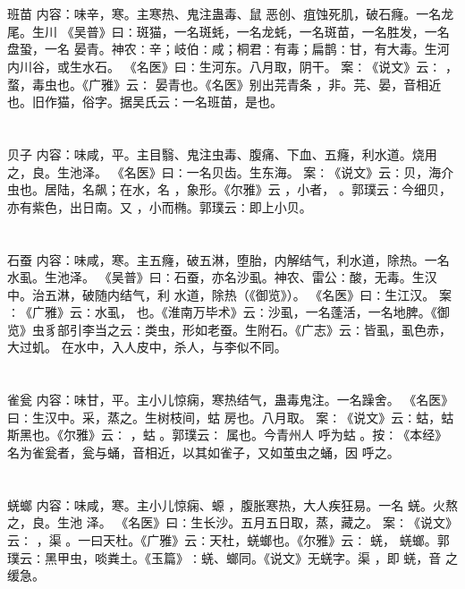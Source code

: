 \documentclass[12pt,UTF8]{ctexbook}
\begin{document}
\section{}班苗
内容：味辛，寒。主寒热、鬼注蛊毒、鼠 恶创、疽蚀死肌，破石癃。一名龙尾。生川 
《吴普》曰∶斑猫，一名斑蚝，一名龙蚝，一名斑苗，一名胜发，一名盘蛩，一名 
晏青。神农∶辛；岐伯∶咸；桐君∶有毒；扁鹊∶甘，有大毒。生河内川谷，或生水石。 
《名医》曰∶生河东。八月取，阴干。 
案∶《说文》云∶ ， 蝥，毒虫也。《广雅》云∶ 晏青也。《名医》别出芫青条 
，非。芫、晏，音相近也。旧作猫，俗字。据吴氏云∶一名班苗，是也。 


\section{}贝子
内容：味咸，平。主目翳、鬼注虫毒、腹痛、下血、五癃，利水道。烧用之，良。生池泽。 
《名医》曰∶一名贝齿。生东海。 
案∶《说文》云∶贝，海介虫也。居陆，名飙；在水，名 ，象形。《尔雅》云 
，小者， 。郭璞云∶今细贝，亦有紫色，出日南。又 ，小而椭。郭璞云∶即上小贝。 


\section{}石蚕
内容：味咸，寒。主五癃，破五淋，堕胎，内解结气，利水道，除热。一名水虱。生池泽。 
《吴普》曰∶石蚕，亦名沙虱。神农、雷公∶酸，无毒。生汉中。治五淋，破随内结气，利 
水道，除热（《御览》）。 
《名医》曰∶生江汉。 
案∶《广雅》云∶水虱， 也。《淮南万毕术》云∶沙虱，一名蓬活，一名地脾。《御 
览》虫豸部引李当之云∶类虫，形如老蚕。生附石。《广志》云∶皆虱，虱色赤，大过虮。 
在水中，入人皮中，杀人，与李似不同。 


\section{}雀瓮
内容：味甘，平。主小儿惊痫，寒热结气，蛊毒鬼注。一名躁舍。 
《名医》曰∶生汉中。采，蒸之。生树枝间，蛄 房也。八月取。 
案∶《说文》云∶蛄，蛄斯黑也。《尔雅》云∶ ，蛄 。郭璞云∶ 属也。今青州人 
呼为蛄 。按∶《本经》名为雀瓮者，瓮与蛹，音相近，以其如雀子，又如茧虫之蛹，因 
呼之。 


\section{}蜣螂
内容：味咸，寒。主小儿惊痫、螈 ，腹胀寒热，大人疾狂易。一名 蜣。火熬之，良。生池 
泽。 
《名医》曰∶生长沙。五月五日取，蒸，藏之。 
案∶《说文》云∶ ，渠 。一曰天杜。《广雅》云∶天杜，蜣螂也。《尔雅》云∶ 蜣， 
蜣螂。郭璞云∶黑甲虫，啖粪土。《玉篇》∶蜣、螂同。《说文》无蜣字。渠 ，即 蜣，音 
之缓急。 
\end{document}
